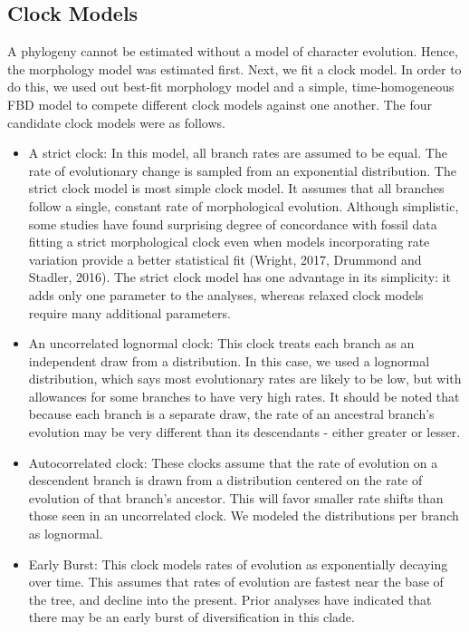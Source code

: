 \documentclass{article}
\begin{document}
\subsection{Clock Models}

A phylogeny cannot be estimated without a model of character evolution. 
Hence, the morphology model was estimated first.
Next, we fit a clock model. 
In order to do this, we used out best-fit morphology model and a simple, time-homogeneous FBD model to compete different clock models against one another.
The four candidate clock models were as follows.
\begin{itemize}
    \item A strict clock: In this model, all branch rates are assumed to be equal. The rate of evolutionary change is sampled from an exponential distribution. The strict clock model is most simple clock model. It assumes that all branches follow a single, constant rate of morphological evolution. Although simplistic, some studies have found surprising degree of concordance with fossil data fitting a strict morphological clock even when models incorporating rate variation provide a better statistical fit (Wright, 2017, Drummond and Stadler, 2016). The strict clock model has one advantage in its simplicity: it adds only one parameter to the analyses, whereas relaxed clock models require many additional parameters.
    \item An uncorrelated lognormal clock: This clock treats each branch as an independent draw from a distribution.  In this case, we used a lognormal distribution, which says most evolutionary rates are likely to be low, but with allowances for some branches to have very high rates. It should be noted that because each branch is a separate draw, the rate of an ancestral branch's evolution may be very different than its descendants - either greater or lesser.
    \item Autocorrelated clock: These clocks assume that the rate of evolution on a descendent branch is drawn from a distribution centered on the rate of evolution of that branch's ancestor. This will favor smaller rate shifts than those seen in an uncorrelated clock. We modeled the distributions per branch as lognormal.
    \item Early Burst: This clock models rates of evolution as exponentially decaying over time. This assumes that rates of evolution are fastest near the base of the tree, and decline into the present. Prior analyses have indicated that there may be an early burst of diversification in this clade.
\end{itemize}
\end{document}
